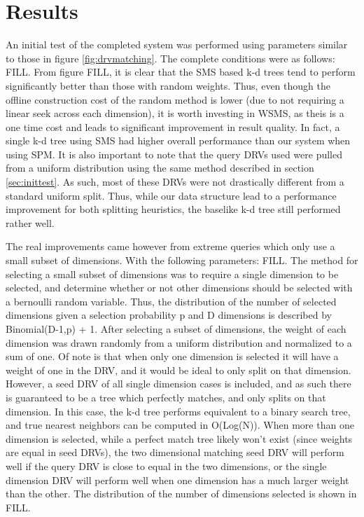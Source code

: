 \chapter{Results} %

\label{results} %


An initial test of the completed system was performed using parameters similar to those in figure \ref{fig:drvmatching}.  The complete conditions were as follows: FILL.  From figure FILL, it is clear that the SMS based k-d trees tend to perform significantly better than those with random weights.  Thus, even though the offline construction cost of the random method is lower (due to not requiring a linear seek across each dimension), it is worth investing in WSMS, as theis is a one time cost and leads to significant improvement in result quality.  In fact, a single k-d tree using SMS had higher overall performance than our system when using SPM.  It is also important to note that the query DRVs used were pulled from a uniform distribution using the same method described in section \ref{sec:inittest}.  As such, most of these DRVs were not drastically different from a standard uniform split.  Thus, while our data structure lead to a performance improvement for both splitting heuristics, the baselike k-d tree still performed rather well.

The real improvements came however from extreme queries which only use a small subset of dimensions.  With the following parameters: FILL.  The method for selecting a small subset of dimensions was to require a single dimension to be selected, and determine whether or not other dimensions should be selected with a bernoulli random variable.  Thus, the distribution of the number of selected dimensions given a selection probability p and D dimensions is described by Binomial(D-1,p) + 1.  After selecting a subset of dimensions, the weight of each dimension was drawn randomly from a uniform distribution and normalized to a sum of one.  Of note is that when only one dimension is selected it will have a weight of one in the DRV, and it would be ideal to only split on that dimension.  However, a seed DRV of all single dimension cases is included, and as such there is guaranteed to be a tree which perfectly matches, and only splits on that dimension.  In this case, the k-d tree performs equivalent to a binary search tree, and true nearest neighbors can be computed in O(Log(N)).  When more than one dimension is selected, while a perfect match tree likely won't exist (since weights are equal in seed DRVs), the two dimensional matching seed DRV will perform well if the query DRV is close to equal in the two dimensions, or the single dimension DRV will perform well when one dimension has a much larger weight than the other.  The distribution of the number of dimensions selected is shown in FILL.

